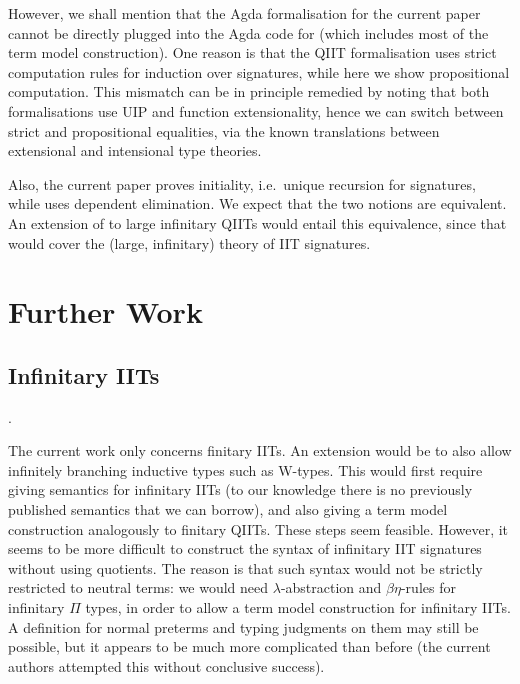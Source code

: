 \documentclass[a4paper,UKenglish,cleveref, autoref]{lipics-v2019}
\begin{document}
However, we shall mention that the Agda formalisation for the current paper
cannot be directly plugged into the Agda code for
\cite{Kaposi:2019:CQI:3302515.3290315} (which includes most of the term model
construction). One reason is that the QIIT formalisation uses strict computation
rules for induction over signatures, while here we show propositional
computation. This mismatch can be in principle remedied by noting that both
formalisations use UIP and function extensionality, hence we can switch between
strict and propositional equalities, via the known translations between
extensional and intensional type
theories\cite{hofmann95extensional,winterhalter2019eliminating}.

Also, the current paper proves initiality, i.e.\ unique recursion for
signatures, while \cite{Kaposi:2019:CQI:3302515.3290315} uses dependent
elimination. We expect that the two notions are equivalent. An extension of
\cite{Kaposi:2019:CQI:3302515.3290315} to large infinitary QIITs would entail
this equivalence, since that would cover the (large, infinitary) theory of IIT
signatures.


\section{Further Work}

\subsection{Infinitary IITs}.

The current work only concerns finitary IITs. An extension would be to also
allow infinitely branching inductive types such as W-types. This would first
require giving semantics for infinitary IITs (to our knowledge there is no
previously published semantics that we can borrow), and also giving a term model
construction analogously to finitary QIITs. These steps seem feasible. However,
it seems to be more difficult to construct the syntax of infinitary IIT
signatures without using quotients. The reason is that such syntax would not be
strictly restricted to neutral terms: we would need $\lambda$-abstraction and
$\beta\eta$-rules for infinitary $\Pi$ types, in order to allow a term model
construction for infinitary IITs. A definition for normal preterms and typing
judgments on them may still be possible, but it appears to be much more
complicated than before (the current authors attempted this without conclusive
success).




\end{document}
